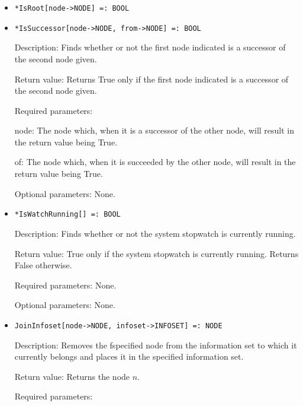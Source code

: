 \begin{itemize}
\item
\protect \large \begin{verbatim}
*IsRoot[node->NODE] =: BOOL
\end{verbatim}\normalsize

\item
\protect \large \begin{verbatim}
*IsSuccessor[node->NODE, from->NODE] =: BOOL
\end{verbatim}\normalsize
\bd
\item
[Description:] Finds whether or not the first node indicated is a
successor of the second node given.
\item
[Return value:] Returns True only if the first node indicated is a
successor of the second node given.
\item
[Required parameters:]\hfil\null
	
\bd
\item
[node:] The node which, when it is a successor of the other node, will
result in the return value being True.
\item
[of:] The node which, when it is succeeded by the other node, will
result in the return value being True.
\ed

\item
[Optional parameters:] None.
\ed

\item
\protect \large \begin{verbatim}
*IsWatchRunning[] =: BOOL
\end{verbatim}\normalsize

\bd
\item
[Description:] Finds whether or not the system stopwatch is currently
running.
\item
[Return value:] True only if the system stopwatch is currently
running.  Returns False otherwise.
\item
[Required parameters:] None.
\item
[Optional parameters:] None.
\ed


\item
\protect \large \begin{verbatim}
JoinInfoset[node->NODE, infoset->INFOSET] =: NODE
\end{verbatim}\normalsize

\bd
\item
[Description:] Removes the fspecified node from the information set to
which it currently belongs and places it in the specified information
set.
\item
[Return value:] Returns the node $n$.
\item
[Required parameters:]\hfil\null
	  

\end{itemize}
